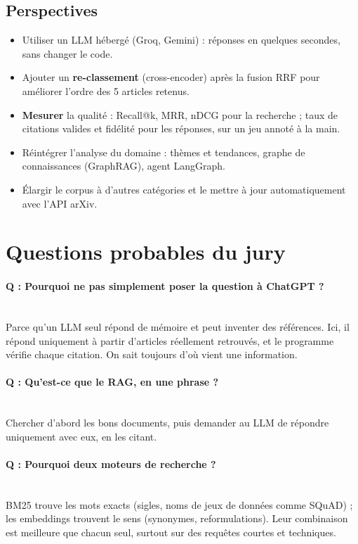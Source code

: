\documentclass[11pt,a4paper]{article}
\begin{document}
\subsection{Perspectives}
\begin{itemize}
  \item Utiliser un LLM hébergé (Groq, Gemini) : réponses en quelques secondes, sans
  changer le code.
  \item Ajouter un \textbf{re-classement} (cross-encoder) après la fusion RRF pour
  améliorer l'ordre des 5 articles retenus.
  \item \textbf{Mesurer} la qualité : Recall@k, MRR, nDCG pour la recherche ; taux de
  citations valides et fidélité pour les réponses, sur un jeu annoté à la main.
  \item Réintégrer l'analyse du domaine : thèmes et tendances, graphe de connaissances
  (GraphRAG), agent LangGraph.
  \item Élargir le corpus à d'autres catégories et le mettre à jour automatiquement avec
  l'API arXiv.
\end{itemize}

\section{Questions probables du jury}

\newcommand{\question}[1]{\paragraph{Q : #1}\mbox{}\\}

\question{Pourquoi ne pas simplement poser la question à ChatGPT ?}
Parce qu'un LLM seul répond de mémoire et peut inventer des références. Ici, il répond
uniquement à partir d'articles réellement retrouvés, et le programme vérifie chaque
citation. On sait toujours d'où vient une information.

\question{Qu'est-ce que le RAG, en une phrase ?}
Chercher d'abord les bons documents, puis demander au LLM de répondre uniquement avec eux,
en les citant.

\question{Pourquoi deux moteurs de recherche ?}
BM25 trouve les mots exacts (sigles, noms de jeux de données comme SQuAD) ; les embeddings
trouvent le sens (synonymes, reformulations). Leur combinaison est meilleure que chacun
seul, surtout sur des requêtes courtes et techniques.
\end{document}
